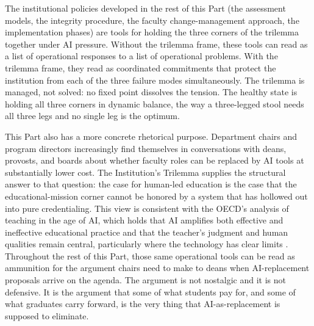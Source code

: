 \documentclass{SIAMbook2023}
\begin{document}
The institutional policies developed in the rest of this Part (the assessment models, the integrity procedure, the faculty change-management approach, the implementation phases) are tools for holding the three corners of the trilemma together under AI pressure. Without the trilemma frame, these tools can read as a list of operational responses to a list of operational problems. With the trilemma frame, they read as coordinated commitments that protect the institution from each of the three failure modes simultaneously. The trilemma is managed, not solved: no fixed point dissolves the tension. The healthy state is holding all three corners in dynamic balance, the way a three-legged stool needs all three legs and no single leg is the optimum.

This Part also has a more concrete rhetorical purpose. Department chairs and program directors increasingly find themselves in conversations with deans, provosts, and boards about whether faculty roles can be replaced by AI tools at substantially lower cost. The Institution's Trilemma supplies the structural answer to that question: the case for human-led education is the case that the educational-mission corner cannot be honored by a system that has hollowed out into pure credentialing. This view is consistent with the OECD's analysis of teaching in the age of AI, which holds that AI amplifies both effective and ineffective educational practice and that the teacher's judgment and human qualities remain central, particularly where the technology has clear limits \citep{schleicher2026quality}. Throughout the rest of this Part, those same operational tools can be read as ammunition for the argument chairs need to make to deans when AI-replacement proposals arrive on the agenda. The argument is not nostalgic and it is not defensive. It is the argument that some of what students pay for, and some of what graduates carry forward, is the very thing that AI-as-replacement is supposed to eliminate.
\end{document}

